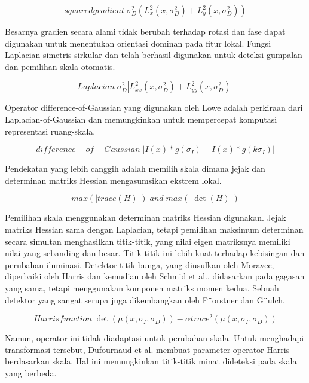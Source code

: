 \begin{equation}
  squared gradient \; \sigma_{D}^{2}(L_{x}^{2}(x, \sigma_{D}^{2}) + L_{y}^{2}(x, \sigma_{D}^{2}))
\end{equation}

Besarnya gradien secara alami tidak berubah terhadap rotasi dan fase dapat digunakan untuk menentukan orientasi dominan pada fitur lokal.
Fungsi Laplacian simetris sirkular dan telah berhasil digunakan untuk deteksi gumpalan dan pemilihan skala otomatis.

\begin{equation}
  Laplacian \; \sigma_{D}^{2}\left\lvert L_{xx}^{2}(x, \sigma_{D}^{2}) + L_{yy}^{2}(x, \sigma_{D}^{2}) \right\rvert 
\end{equation}

Operator difference-of-Gaussian yang digunakan oleh Lowe adalah perkiraan dari Laplacian-of-Gaussian dan memungkinkan untuk mempercepat komputasi representasi ruang-skala.

\begin{equation}
  difference-of-Gaussian \; \left\lvert I(x)*g(\sigma_{I}) - I(x)*g(k\sigma_{I}) \right\rvert 
\end{equation}

Pendekatan yang lebih canggih adalah memilih skala dimana jejak dan determinan matriks Hessian mengasumsikan ekstrem lokal.

\begin{equation}
  max(\left\lvert trace(H) \right\rvert) \; and \; max(\left\lvert \det(H) \right\rvert)
\end{equation}

Pemilihan skala menggunakan determinan matriks Hessian digunakan. Jejak matriks Hessian sama dengan Laplacian, tetapi pemilihan maksimum determinan secara simultan menghasilkan titik-titik, yang nilai eigen matriksnya memiliki nilai yang sebanding dan besar. Titik-titik ini lebih kuat terhadap kebisingan dan perubahan iluminasi. Detektor titik bunga, yang diusulkan oleh Moravec, diperbaiki oleh Harris dan kemudian oleh Schmid et al., didasarkan pada gagasan yang sama, tetapi menggunakan komponen matriks momen kedua. Sebuah detektor yang sangat serupa juga dikembangkan oleh F¨orstner dan G¨ulch.

\begin{equation}
  Harris function \; \det(\mu(x, \sigma_{I},\sigma_{D})) - \alpha trace^{2}(\mu(x, \sigma_{I},\sigma_{D}))
\end{equation}

Namun, operator ini tidak diadaptasi untuk perubahan skala. Untuk menghadapi transformasi tersebut, Dufournaud et al. membuat parameter operator Harris berdasarkan skala. Hal ini memungkinkan titik-titik minat dideteksi pada skala yang berbeda.

